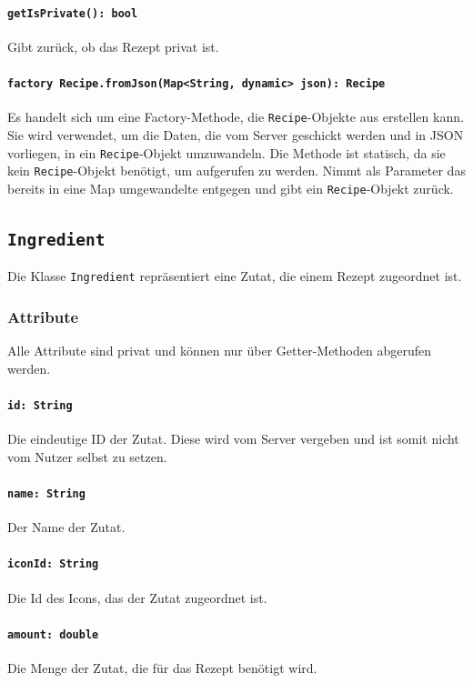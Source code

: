 \documentclass{entwurfsheft}
\begin{document}
\paragraph{\texttt{getIsPrivate(): bool}}
Gibt zurück, ob das Rezept privat ist.
\paragraph{\texttt{factory Recipe.fromJson(Map<String, dynamic> json): Recipe}}
Es handelt sich um eine Factory-Methode, die \texttt{Recipe}-Objekte aus  erstellen kann. Sie wird verwendet, um die Daten, die vom Server geschickt werden und in \Gls{JSON} vorliegen, in ein \texttt{Recipe}-Objekt umzuwandeln. Die Methode ist statisch, da sie kein \texttt{Recipe}-Objekt benötigt, um aufgerufen zu werden. Nimmt als Parameter das bereits in eine Map umgewandelte  entgegen und gibt ein \texttt{Recipe}-Objekt zurück.

\newpage
\subsection{\texttt{Ingredient}}\label{sec:ingredient}
Die Klasse \texttt{Ingredient} repräsentiert eine Zutat, die einem Rezept zugeordnet ist.
\subsubsection*{Attribute}
Alle Attribute sind privat und können nur über Getter-Methoden abgerufen werden.
\paragraph{\texttt{id: String}}
Die eindeutige ID der Zutat. Diese wird vom Server vergeben und ist somit nicht vom Nutzer selbst zu setzen.
\paragraph{\texttt{name: String}}
Der Name der Zutat.
\paragraph{\texttt{iconId: String}}
Die Id des Icons, das der Zutat zugeordnet ist.
\paragraph{\texttt{amount: double}}
Die Menge der Zutat, die für das Rezept benötigt wird.
\end{document}
